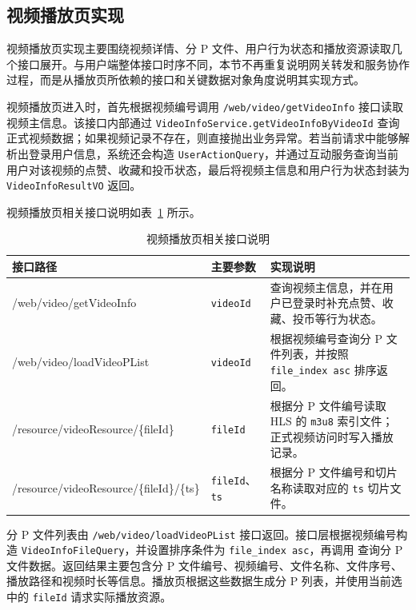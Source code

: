 \subsection{视频播放页实现}

视频播放页实现主要围绕视频详情、分 P 文件、用户行为状态和播放资源读取几个接口展开。与用户端整体接口时序不同，本节不再重复说明网关转发和服务协作过程，而是从播放页所依赖的接口和关键数据对象角度说明其实现方式。

视频播放页进入时，首先根据视频编号调用 \texttt{/web/video/getVideoInfo} 接口读取视频主信息。该接口内部通过 \texttt{VideoInfoService.getVideoInfoByVideoId} 查询正式视频数据；如果视频记录不存在，则直接抛出业务异常。若当前请求中能够解析出登录用户信息，系统还会构造 \texttt{UserActionQuery}，并通过互动服务查询当前用户对该视频的点赞、收藏和投币状态，最后将视频主信息和用户行为状态封装为 \texttt{VideoInfoResultVO} 返回。

视频播放页相关接口说明如表~\ref{tab:video-play-api} 所示。

\begin{table}[!htbp]
    \centering
    \caption{视频播放页相关接口说明}
    \label{tab:video-play-api}
    \begin{tabular}{p{} p{} p{}}
        \toprule
        \textbf{接口路径} & \textbf{主要参数} & \textbf{实现说明} \\
        \midrule
        /web/video/getVideoInfo
        & \texttt{videoId}
        & 查询视频主信息，并在用户已登录时补充点赞、收藏、投币等行为状态。 \\

        /web/video/loadVideoPList
        & \texttt{videoId}
        & 根据视频编号查询分 P 文件列表，并按照 \texttt{file\_index asc} 排序返回。 \\

        /resource/videoResource/\{fileId\}
        & \texttt{fileId}
        & 根据分 P 文件编号读取 HLS 的 \texttt{m3u8} 索引文件；正式视频访问时写入播放记录。 \\

        /resource/videoResource/\{fileId\}/\{ts\}
        & \texttt{fileId}、\texttt{ts}
        & 根据分 P 文件编号和切片名称读取对应的 \texttt{ts} 切片文件。 \\
        \bottomrule
    \end{tabular}
\end{table}

分 P 文件列表由 \texttt{/web/video/loadVideoPList} 接口返回。接口层根据视频编号构造 \texttt{VideoInfoFileQuery}，并设置排序条件为 \texttt{file\_index asc}，再调用 \texttt{} 查询分 P 文件数据。返回结果主要包含分 P 文件编号、视频编号、文件名称、文件序号、播放路径和视频时长等信息。播放页根据这些数据生成分 P 列表，并使用当前选中的 \texttt{fileId} 请求实际播放资源。

